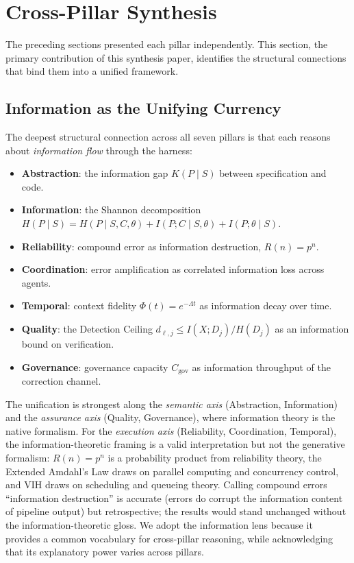 \documentclass[11pt, a4paper, logo, copyright]{googledeepmind}
\begin{document}
\section{Cross-Pillar Synthesis}
\label{sec:synthesis}

The preceding sections presented each pillar independently. This section, the primary contribution of this synthesis paper, identifies the structural connections that bind them into a unified framework.

\subsection{Information as the Unifying Currency}

The deepest structural connection across all seven pillars is that each reasons about \emph{information flow} through the harness:

\begin{itemize}[nosep]
    \item \textbf{Abstraction}: the information gap $K(P \mid S)$ between specification and code.
    \item \textbf{Information}: the Shannon decomposition $H(P \mid S) = H(P \mid S,C,\theta) + I(P;C \mid S,\theta) + I(P;\theta \mid S)$.
    \item \textbf{Reliability}: compound error as information destruction, $R(n) = p^n$.
    \item \textbf{Coordination}: error amplification as correlated information loss across agents.
    \item \textbf{Temporal}: context fidelity $\Phi(t) = e^{-\Lambda t}$ as information decay over time.
    \item \textbf{Quality}: the Detection Ceiling $d_{\ell,j} \leq I(X; D_j)/H(D_j)$ as an information bound on verification.
    \item \textbf{Governance}: governance capacity $C_{\text{gov}}$ as information throughput of the correction channel.
\end{itemize}

The unification is strongest along the \emph{semantic axis} (Abstraction, Information) and the \emph{assurance axis} (Quality, Governance), where information theory is the native formalism. For the \emph{execution axis} (Reliability, Coordination, Temporal), the information-theoretic framing is a valid interpretation but not the generative formalism: $R(n) = p^n$ is a probability product from reliability theory, the Extended Amdahl's Law draws on parallel computing and concurrency control, and VIH draws on scheduling and queueing theory. Calling compound errors ``information destruction'' is accurate (errors do corrupt the information content of pipeline output) but retrospective; the results would stand unchanged without the information-theoretic gloss. We adopt the information lens because it provides a common vocabulary for cross-pillar reasoning, while acknowledging that its explanatory power varies across pillars.
\end{document}
